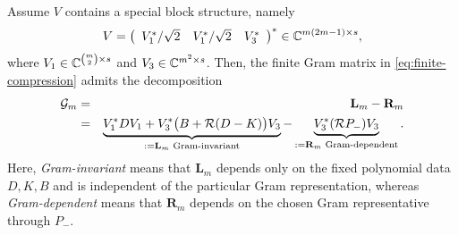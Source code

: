 \begin{lemma}\label{lem:finite-decomposition}
Assume $V$ contains a special block structure, namely
\begin{equation}\label{eq:special-V}
V=
\left(
\begin{array}{ccc}
V_1^*/\sqrt2&
V_1^*/\sqrt2&
V_3^*
\end{array}
\right)^*
\in\mathbb{C}^{m(2m-1)\times s},
\end{equation}
where $V_1 \in \mathbb{C}^{\binom m2 \times s}$ and
$V_3 \in \mathbb{C}^{m^2\times s}$.
Then, the finite Gram matrix in \eqref{eq:finite-compression} admits the decomposition
\begin{eqnarray}\label{eq:finite-decomposition}
   \mathcal G_m &=& \mathbf L_m-\mathbf R_m
   \\ &=&
\underbrace{
 V_1^*DV_1
 +
 V_3^*
 \bigl(B+\mathcal{R}(D-K)\bigr)V_3
}_{:= \mathbf L_m \text{ Gram-invariant}}
-
\underbrace{
 V_3^*(\mathcal{R} P_-)V_3
}_{:= \mathbf R_m \text{ Gram-dependent}} .
\end{eqnarray}
Here, \emph{Gram-invariant} means that $\mathbf L_m$ depends only on the fixed polynomial data $D,K,B$ and is independent of the particular Gram representation, whereas \emph{Gram-dependent} means that $\mathbf R_m$ depends on the chosen Gram representative through $P_-$.
\end{lemma}

